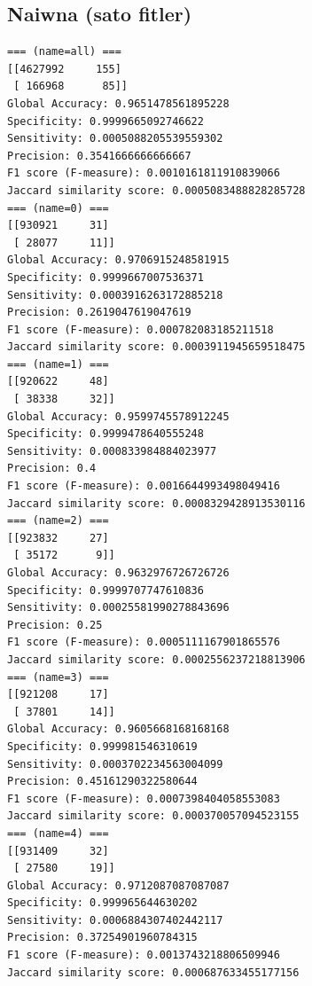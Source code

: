 \documentclass{bmvc2k}
\begin{document}
\subsection{Naiwna (sato fitler)}
\begin{verbatim}
=== (name=all) ===
[[4627992     155]
 [ 166968      85]]
Global Accuracy: 0.9651478561895228
Specificity: 0.9999665092746622
Sensitivity: 0.0005088205539559302
Precision: 0.3541666666666667
F1 score (F-measure): 0.0010161811910839066
Jaccard similarity score: 0.0005083488828285728
=== (name=0) ===
[[930921     31]
 [ 28077     11]]
Global Accuracy: 0.9706915248581915
Specificity: 0.9999667007536371
Sensitivity: 0.0003916263172885218
Precision: 0.2619047619047619
F1 score (F-measure): 0.000782083185211518
Jaccard similarity score: 0.0003911945659518475
=== (name=1) ===
[[920622     48]
 [ 38338     32]]
Global Accuracy: 0.9599745578912245
Specificity: 0.9999478640555248
Sensitivity: 0.000833984884023977
Precision: 0.4
F1 score (F-measure): 0.0016644993498049416
Jaccard similarity score: 0.0008329428913530116
=== (name=2) ===
[[923832     27]
 [ 35172      9]]
Global Accuracy: 0.9632976726726726
Specificity: 0.9999707747610836
Sensitivity: 0.00025581990278843696
Precision: 0.25
F1 score (F-measure): 0.0005111167901865576
Jaccard similarity score: 0.0002556237218813906
=== (name=3) ===
[[921208     17]
 [ 37801     14]]
Global Accuracy: 0.9605668168168168
Specificity: 0.999981546310619
Sensitivity: 0.0003702234563004099
Precision: 0.45161290322580644
F1 score (F-measure): 0.0007398404058553083
Jaccard similarity score: 0.000370057094523155
=== (name=4) ===
[[931409     32]
 [ 27580     19]]
Global Accuracy: 0.9712087087087087
Specificity: 0.999965644630202
Sensitivity: 0.0006884307402442117
Precision: 0.37254901960784315
F1 score (F-measure): 0.0013743218806509946
Jaccard similarity score: 0.000687633455177156
\end{verbatim}
\end{document}
